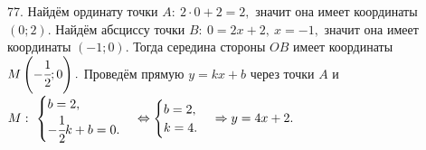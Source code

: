 77. Найдём ординату точки $A:\ 2\cdot0+2=2,$ значит она имеет координаты $(0;2).$ Найдём абсциссу точки $B:\ 0=2x+2,\ x=-1,$ значит она имеет координаты $(-1;0).$ Тогда середина стороны $OB$ имеет координаты $M\left(-\cfrac{1}{2};0\right).$ Проведём прямую $y=kx+b$ через точки $A$ и $M:\ \begin{cases} b=2,\\ -\cfrac{1}{2}k+b=0.\end{cases}\Leftrightarrow\begin{cases} b=2,\\ k=4.\end{cases}\Rightarrow y=4x+2.$\\
